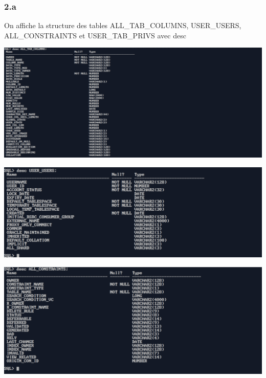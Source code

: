 \subsubsection*{2.a}
On affiche la structure des tables ALL\_TAB\_COLUMNS, USER\_USERS,
ALL\_CONSTRAINTS et USER\_TAB\_PRIVS avec desc



\begin{center}
    \includegraphics[width=\textwidth]{ScreenShot/Partie5/desc1.png}
\end{center}

\begin{center}
    \includegraphics[width=\textwidth]{ScreenShot/Partie5/desc2.png}
\end{center}


\begin{center}
    \includegraphics[width=\textwidth]{ScreenShot/Partie5/desc3.png}
\end{center}


